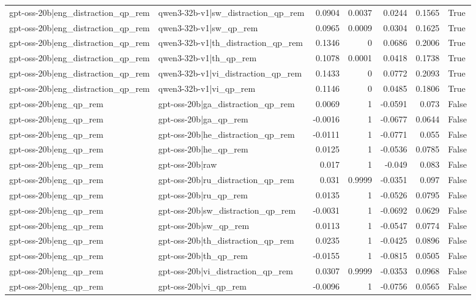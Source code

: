 \begin{table}
\begin{tabular}{l l r r r r l}
gpt-oss-20b|eng_distraction_qp_rem & qwen3-32b-v1|sw_distraction_qp_rem & 0.0904 & 0.0037 & 0.0244 & 0.1565 & True \\
gpt-oss-20b|eng_distraction_qp_rem & qwen3-32b-v1|sw_qp_rem & 0.0965 & 0.0009 & 0.0304 & 0.1625 & True \\
gpt-oss-20b|eng_distraction_qp_rem & qwen3-32b-v1|th_distraction_qp_rem & 0.1346 & 0 & 0.0686 & 0.2006 & True \\
gpt-oss-20b|eng_distraction_qp_rem & qwen3-32b-v1|th_qp_rem & 0.1078 & 0.0001 & 0.0418 & 0.1738 & True \\
gpt-oss-20b|eng_distraction_qp_rem & qwen3-32b-v1|vi_distraction_qp_rem & 0.1433 & 0 & 0.0772 & 0.2093 & True \\
gpt-oss-20b|eng_distraction_qp_rem & qwen3-32b-v1|vi_qp_rem & 0.1146 & 0 & 0.0485 & 0.1806 & True \\
gpt-oss-20b|eng_qp_rem & gpt-oss-20b|ga_distraction_qp_rem & 0.0069 & 1 & -0.0591 & 0.073 & False \\
gpt-oss-20b|eng_qp_rem & gpt-oss-20b|ga_qp_rem & -0.0016 & 1 & -0.0677 & 0.0644 & False \\
gpt-oss-20b|eng_qp_rem & gpt-oss-20b|he_distraction_qp_rem & -0.0111 & 1 & -0.0771 & 0.055 & False \\
gpt-oss-20b|eng_qp_rem & gpt-oss-20b|he_qp_rem & 0.0125 & 1 & -0.0536 & 0.0785 & False \\
gpt-oss-20b|eng_qp_rem & gpt-oss-20b|raw & 0.017 & 1 & -0.049 & 0.083 & False \\
gpt-oss-20b|eng_qp_rem & gpt-oss-20b|ru_distraction_qp_rem & 0.031 & 0.9999 & -0.0351 & 0.097 & False \\
gpt-oss-20b|eng_qp_rem & gpt-oss-20b|ru_qp_rem & 0.0135 & 1 & -0.0526 & 0.0795 & False \\
gpt-oss-20b|eng_qp_rem & gpt-oss-20b|sw_distraction_qp_rem & -0.0031 & 1 & -0.0692 & 0.0629 & False \\
gpt-oss-20b|eng_qp_rem & gpt-oss-20b|sw_qp_rem & 0.0113 & 1 & -0.0547 & 0.0774 & False \\
gpt-oss-20b|eng_qp_rem & gpt-oss-20b|th_distraction_qp_rem & 0.0235 & 1 & -0.0425 & 0.0896 & False \\
gpt-oss-20b|eng_qp_rem & gpt-oss-20b|th_qp_rem & -0.0155 & 1 & -0.0815 & 0.0505 & False \\
gpt-oss-20b|eng_qp_rem & gpt-oss-20b|vi_distraction_qp_rem & 0.0307 & 0.9999 & -0.0353 & 0.0968 & False \\
gpt-oss-20b|eng_qp_rem & gpt-oss-20b|vi_qp_rem & -0.0096 & 1 & -0.0756 & 0.0565 & False \\

\end{tabular}
\end{table}
